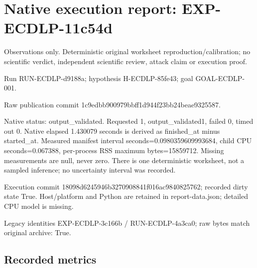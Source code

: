 \documentclass[10pt]{article}
\begin{document}
\section*{Native execution report: EXP-ECDLP-11c54d}
\noindent Observations only. Deterministic original worksheet reproduction/calibration; no scientific verdict, independent scientific review, attack claim or execution proof.\par\medskip
\noindent Run RUN-ECDLP-d9188a; hypothesis H-ECDLP-85fe43; goal GOAL-ECDLP-001.\par
\noindent Raw publication commit 1c9edbb900979bbff1d944f23bb24beae9325587.\par\medskip
Native status: output\_validated. Requested 1, output\_validated1, failed 0, timed out 0. Native elapsed 1.430079 seconds is derived as finished\_at minus started\_at. Measured manifest interval seconds=0.0980359609993684, child CPU seconds=0.067388, per-process RSS maximum bytes=15859712. Missing measurements are null, never zero. There is one deterministic worksheet, not a sampled inference; no uncertainty interval was recorded.\par\medskip
Execution commit 18098d6245946b3270908841f016ac9840825762; recorded dirty state True. Host/platform and Python are retained in report-data.json; detailed CPU model is missing.\par\medskip
Legacy identities EXP-ECDLP-3c166b / RUN-ECDLP-4a3ca0; raw bytes match original archive: True.
\subsection*{Recorded metrics}

\end{document}
